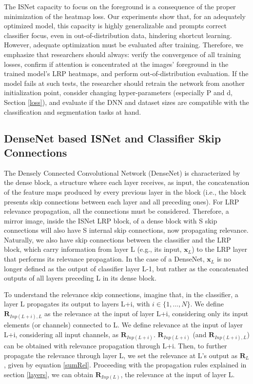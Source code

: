 \documentclass[fleqn,10pt]{wlscirep}
\begin{document}
{The ISNet capacity to focus on the foreground is a consequence of the proper minimization of the heatmap loss. Our experiments show that, for an adequately optimized model, this capacity is highly generalizable and prompts correct classifier focus, even in out-of-distribution data, hindering shortcut learning. However, adequate optimization must be evaluated after training. Therefore, we emphasize that researchers should always: verify the convergence of all training losses, confirm if attention is concentrated at the images' foreground in the trained model's LRP heatmaps, and perform out-of-distribution evaluation. If the model fails at such tests, the researcher should retrain the network from another initialization point, consider changing hyper-parameters (especially P and d, Section \ref{loss}), and evaluate if the DNN and dataset sizes are compatible with the classification and segmentation tasks at hand.



\subsection{DenseNet based ISNet and Classifier Skip Connections}

The Densely Connected Convolutional Network (DenseNet) is characterized by the dense block, a structure where each layer receives, as input, the concatenation of the feature maps produced by every previous layer in the block\cite{DenseNet} (i.e., the block presents skip connections between each layer and all preceding ones). For LRP relevance propagation, all the connections must be considered. Therefore, a mirror image, inside the ISNet LRP block, of a dense block with S skip connections will also have S internal skip connections, now propagating relevance. Naturally, we also have skip connections between the classifier and the LRP block, which carry information from layer L (e.g., its input, $\bm{x}_{L}$) to the LRP layer that performs its relevance propagation. In the case of a DenseNet, $\bm{x}_{L}$ is no longer defined as the output of classifier layer L-1, but rather as the concatenated outputs of all layers preceding L in its dense block.

To understand the relevance skip connections, imagine that, in the classifier, a layer L propagates its output to layers L+i, with $i \in \{1,...,N\}$. We define $\bm{R}_{Inp(L+i),L}$ as the relevance at the input of layer L+i, considering only its input elements (or channels) connected to L. We define relevance at the input of layer L+i, considering all input channels, as $\bm{R}_{Inp(L+i)}$. $\bm{R}_{Inp(L+i)}$ (and $\bm{R}_{Inp(L+i),L}$) can be obtained with relevance propagation through L+i. Then, to further propagate the relevance through layer L, we set the relevance at L's output as $\bm{R}_{L}$, given by equation \ref{sumRel}. Proceeding with the propagation rules explained in section \ref{layers}, we can obtain $\bm{R}_{Inp(L)}$, the relevance at the input of layer L.

}
\end{document}
